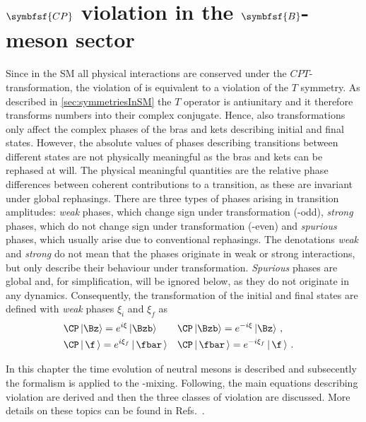 \chapter[head={\CP violation in the $B$-meson sector},tocentry={$\symbfsf{C{}P}$ violation in the $\symbfsf{B}$-meson sector}]
{$\symbfsf{C{}P}$ violation in the $\symbfsf{B}$-meson sector}
\label{chap:CPV}

Since in the \ac{SM} all physical interactions are conserved under the $CPT$-transformation, the violation of \CP is equivalent to a violation of the $T$ symmetry.
As described in \cref{sec:symmetriesInSM} the $T$ operator is antiunitary and it therefore transforms numbers into their complex conjugate.
Hence, also \CP transformations only affect the complex phases of the bras and kets describing initial and final states.
However, the absolute values of phases describing transitions between different states are not physically meaningful as the bras and kets can be rephased at will.
The physical meaningful quantities are the relative phase differences between coherent contributions to a transition, as these are invariant under global rephasings.
There are three types of phases arising in transition amplitudes:
\emph{weak} phases, which change sign under \CP transformation (\CP-odd), \emph{strong} phases, which do not change sign under \CP transformation (\CP-even) and \emph{spurious} phases, which usually arise due to conventional rephasings.
The denotations \emph{weak} and \emph{strong} do not mean that the phases originate in weak or strong interactions, but only describe their behaviour under \CP transformation.
\emph{Spurious} phases are global and, for simplification, will be ignored below, as they do not originate in any dynamics.
Consequently, the \CP transformation of the initial and final states are defined with \emph{weak} phases $\xi_i$ and $\xi_f$ as
\begin{equation}
\begin{aligned}
&\CP\left|\Bz\right> =e^{i\xi}\left|\Bzb\right>&&\CP\left|\Bzb\right>=e^{-i\xi}\left|\Bz\right>\,,&\\
&\CP\left|\,\f\,\right> =e^{i\xi_f}\left|\,\fbar\,\right>&&\CP\left|\,\fbar\,\right>=e^{-i\xi_f}\left|\,\f\,\right>\,.& \label{eq:CPTransInitFinal}
\end{aligned}
\end{equation}

In this chapter the time evolution of neutral mesons is described and subsecently the formalism is applied to the \Bz-\Bzb mixing.
Following, the main equations describing \CP violation are derived and then the three classes of \CP violation are discussed.
More details on these topics can be found in Refs.~\cite{Branco:396964,Bigi:1295518}.

